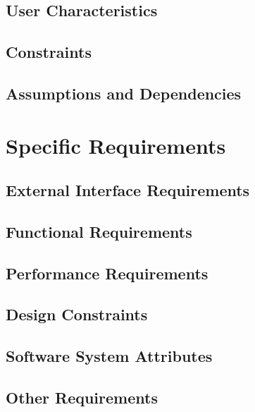 \documentclass{article}
\begin{document}
	\subsection{User Characteristics}
	
	
	\subsection{Constraints}
	
	
	\subsection{Assumptions and Dependencies}
	
	
\section{Specific Requirements}
	\subsection{External Interface Requirements}
	
	
	\subsection{Functional Requirements}
	
	
	\subsection{Performance Requirements}
	
	
	\subsection{Design Constraints}
	
	
	\subsection{Software System Attributes}
	
	
	\subsection{Other Requirements}
	
\end{document}
